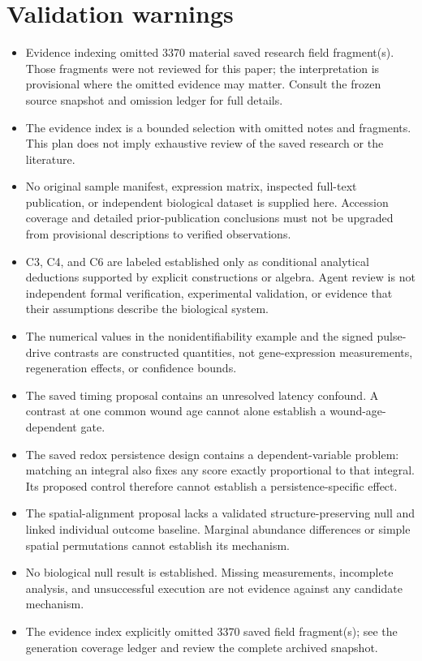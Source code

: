 \documentclass[11pt]{article}
\begin{document}
\section*{Validation warnings}
\begin{itemize}
\item Evidence indexing omitted 3370 material saved research field fragment(s). Those fragments were not reviewed for this paper; the interpretation is provisional where the omitted evidence may matter. Consult the frozen source snapshot and omission ledger for full details.
\item The evidence index is a bounded selection with omitted notes and fragments. This plan does not imply exhaustive review of the saved research or the literature.
\item No original sample manifest, expression matrix, inspected full-text publication, or independent biological dataset is supplied here. Accession coverage and detailed prior-publication conclusions must not be upgraded from provisional descriptions to verified observations.
\item C3, C4, and C6 are labeled established only as conditional analytical deductions supported by explicit constructions or algebra. Agent review is not independent formal verification, experimental validation, or evidence that their assumptions describe the biological system.
\item The numerical values in the nonidentifiability example and the signed pulse-drive contrasts are constructed quantities, not gene-expression measurements, regeneration effects, or confidence bounds.
\item The saved timing proposal contains an unresolved latency confound. A contrast at one common wound age cannot alone establish a wound-age-dependent gate.
\item The saved redox persistence design contains a dependent-variable problem: matching an integral also fixes any score exactly proportional to that integral. Its proposed control therefore cannot establish a persistence-specific effect.
\item The spatial-alignment proposal lacks a validated structure-preserving null and linked individual outcome baseline. Marginal abundance differences or simple spatial permutations cannot establish its mechanism.
\item No biological null result is established. Missing measurements, incomplete analysis, and unsuccessful execution are not evidence against any candidate mechanism.
\item The evidence index explicitly omitted 3370 saved field fragment(s); see the generation coverage ledger and review the complete archived snapshot.

\end{itemize}
\end{document}
